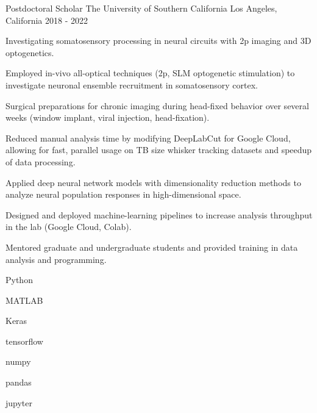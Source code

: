 \begin{cventries}
  \cventry%
    {Postdoctoral Scholar} %
    {The University of Southern California} %
    {Los Angeles, California} %
    {2018 \-- 2022} %
    {%
      \begin{cvsentence}Investigating somatosensory processing in neural circuits with 2p imaging and 3D optogenetics.\end{cvsentence}
      \begin{cvitems} %
        \item {Employed in-vivo all-optical techniques (2p, SLM optogenetic stimulation) to investigate neuronal ensemble recruitment in somatosensory cortex.}
        \item {Surgical preparations for chronic imaging during head-fixed behavior over several weeks (window implant, viral injection, head-fixation).}
        \item {Reduced manual analysis time by modifying DeepLabCut for Google Cloud, allowing for fast, parallel usage on TB size whisker tracking datasets and speedup of data processing.}
        \item {Applied deep neural network models with dimensionality reduction methods to analyze neural population responses in high-dimensional space.}
        \item {Designed and deployed machine-learning pipelines to increase analysis throughput in the lab (Google Cloud, Colab).}
        \item {Mentored graduate and undergraduate students and provided training in data analysis and programming.}
      \end{cvitems}
    }
    \begin{cventryskills}
      \item Python
      \item MATLAB
      \item Keras
      \item tensorflow
      \item numpy
      \item pandas
      \item jupyter
    \end{cventryskills}


\end{cventries}
